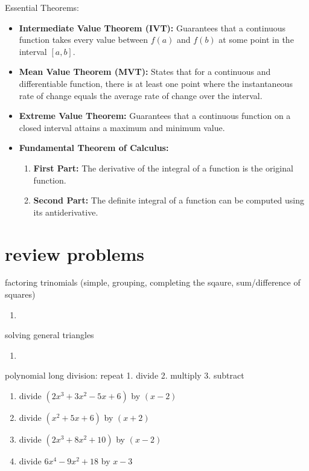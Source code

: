 \documentclass{article}
\begin{document}
Essential Theorems:
\begin{itemize}
    \item \textbf{Intermediate Value Theorem (IVT):} Guarantees that a continuous function takes every value between \( f(a) \) and \( f(b) \) at some point in the interval \([a, b]\).
    \item \textbf{Mean Value Theorem (MVT):} States that for a continuous and differentiable function, there is at least one point where the instantaneous rate of change equals the average rate of change over the interval.
    \item \textbf{Extreme Value Theorem:} Guarantees that a continuous function on a closed interval attains a maximum and minimum value.
    \item \textbf{Fundamental Theorem of Calculus:}
    \begin{enumerate}
        \item \textbf{First Part:} The derivative of the integral of a function is the original function.
        \item \textbf{Second Part:} The definite integral of a function can be computed using its antiderivative.
    \end{enumerate}
\end{itemize}

\newpage
\section*{review problems}

factoring trinomials (simple, grouping, completing the sqaure, sum/difference of squares)
	\begin{enumerate}
		\item
	\end{enumerate}

solving general triangles
	\begin{enumerate}
		\item
	\end{enumerate}

polynomial long division: repeat 1. divide 2. multiply  3. subtract
	\begin{enumerate}
		\item divide $(2x^3+3x^2-5x+6)$ by $(x-2)$
		\item divide $(x^2+5x+6)$ by $(x+2)$ 
		\item divide $(2x^3+8x^2+10)$ by $(x-2)$ 
		\item divide $6x^4-9x^2+18$ by $x-3$ 
	\end{enumerate}
\end{document}
